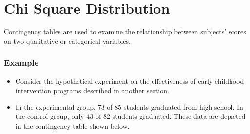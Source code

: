 \documentclass[slidemain.tex]{subfiles}
\begin{document}
 


\section{Chi Square Distribution}
\begin{frame}
Contingency tables are used to examine the relationship between subjects' scores on two qualitative or categorical variables. 

\end{frame}

\begin{frame}
\frametitle{Example}
\begin{itemize}
\item Consider the hypothetical experiment on the effectiveness of early childhood intervention programs described in another section.
\item In the experimental group, 73 of 85 students graduated from high school. In the control group, only 43 of 82 students graduated. These data are depicted in the contingency table shown below.
\end{itemize}
\end{frame}

\end{document}
